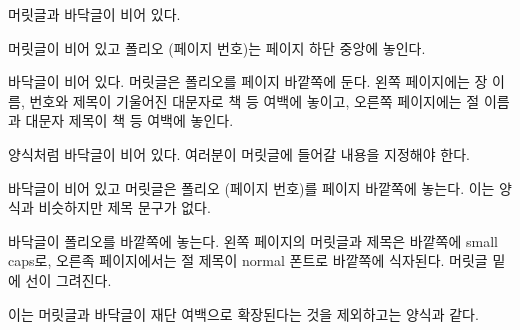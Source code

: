 \begin{plainlist}
\begin{plainlist}
\item[\pstyle{empty}] 머릿글과 바닥글이
  비어 있다.
\item[\pstyle{plain}] 머릿글이 비어 있고
     폴리오 (페이지 번호)는 페이지 하단 중앙에 놓인다.
\item[\pstyle{headings}] 바닥글이 비어 있다.
     머릿글은 폴리오를 페이지 바깥쪽에
     둔다. 왼쪽 페이지에는 장 이름, 번호와 제목이 기울어진 대문자로 책 등
     여백에 놓이고, 오른쪽 페이지에는 절 이름과 대문자 제목이 책 등 여백에
     놓인다.
\item[\pstyle{myheadings}]  양식처럼 바닥글이 비어 있다.
     여러분이 머릿글에 들어갈 내용을 지정해야 한다.
\item[\pstyle{simple}] 바닥글이 비어 있고
     머릿글은 폴리오 (페이지 번호)를
     페이지 바깥쪽에 놓는다.
     이는  양식과 비슷하지만 제목 문구가 없다.
\item[\pstyle{ruled}] 바닥글이
     폴리오를 바깥쪽에 놓는다.
     왼쪽 페이지의 머릿글과 제목은 바깥쪽에 small caps로,
     오른족 페이지에서는 절 제목이 normal 폰트로 바깥쪽에 식자된다.
     머릿글 밑에 선이 그려진다.
\item[\pstyle{Ruled}] 이는 머릿글과
     바닥글이 재단
     여백으로 확장된다는 것을
     제외하고는  양식과 같다.

\end{plainlist}
\end{plainlist}
